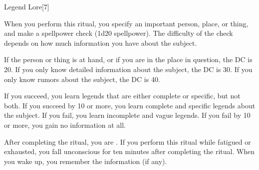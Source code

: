 \begin{spellsection}[Greater]{Legend Lore}[7]
    \begin{spellheader}
    \end{spellheader}
    \begin{spellcontent}
        \begin{spelltargetinginfo}
        \end{spelltargetinginfo}
        \begin{spelleffects}
            \spelleffect When you perform this ritual, you specify an important person, place, or thing, and make a spellpower check (1d20 \add spellpower). The difficulty of the check depends on how much information you have about the subject.

            If the person or thing is at hand, or if you are in the place in question, the DC is 20. If you only know detailed information about the subject, the DC is 30. If you only know rumors about the subject, the DC is 40.

            If you succeed, you learn legends that are either complete or specific, but not both. If you succeed by 10 or more, you learn complete and specific legends about the subject.  If you fail, you learn incomplete and vague legends. If you fail by 10 or more, you gain no information at all.

            After completing the ritual, you are \exhausted. If you perform this ritual while fatigued or exhausted, you fall unconscious for ten minutes after completing the ritual. When you wake up, you remember the information (if any).
        \end{spelleffects}
    \end{spellcontent}
    \begin{spellfooter}
    \end{spellfooter}
\end{spellsection}

